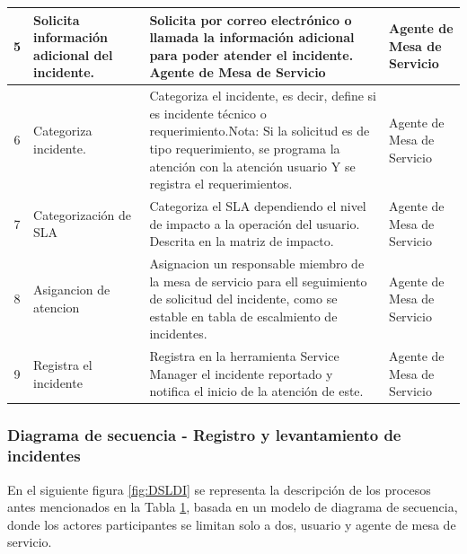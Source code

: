 \begin{table}[H]
{\begin{tabular}{|c|p{9.5em}|p{22em}|p{14.645em}|}
	\midrule
	5 & Solicita información adicional del incidente. & Solicita por correo electrónico o llamada la información adicional para poder atender el incidente.	\newline{}Agente de Mesa de Servicio & Agente de Mesa de Servicio \\
	\midrule
	6 & Categoriza incidente. & Categoriza el incidente, es decir, define si es incidente técnico o requerimiento.\newline{}Nota: Si la solicitud es de tipo requerimiento,  se programa la atención con la atención usuario Y se registra el requerimientos. & Agente de Mesa de Servicio \\
	\midrule
	7 & Categorización de SLA  & Categoriza el SLA dependiendo el nivel de impacto a la operación del usuario. Descrita en la matriz de impacto.  & Agente de Mesa de Servicio \\
	\midrule
	8 & Asigancion de atencion  &  Asignacion un responsable miembro de la mesa de servicio para ell seguimiento  de solicitud del incidente, como se estable en tabla de escalmiento de incidentes. & Agente de Mesa de Servicio \\
	\midrule
	9 & Registra el incidente & Registra en la herramienta Service Manager el incidente reportado y notifica el inicio de la atención de este. & Agente de Mesa de Servicio \\
	\bottomrule
	
	\end{tabular}%
	\label{tab:FDTLDI}}%
\end{table}%


\subsubsection{Diagrama de secuencia - Registro y levantamiento de incidentes}

En el siguiente figura  \ref{fig:DSLDI} se representa la descripción de los procesos antes mencionados en la Tabla \ref{tab:FDTLDI}, basada en un modelo de  diagrama de secuencia, donde los actores participantes se limitan solo a dos, usuario y agente de mesa de servicio. 

